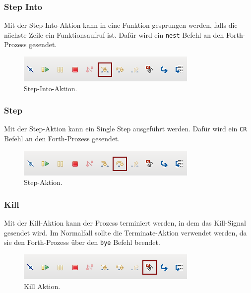 \subsubsection{Step Into}

Mit der Step-Into-Aktion kann in eine Funktion gesprungen werden, falls die nächste Zeile ein Funktionsaufruf ist. Dafür wird ein \verb!nest! Befehl an den Forth-Prozess gesendet.

\begin{figure}[H]
	\centering
		\includegraphics[scale=1]{debugger/stepinto.png}
		\caption{Step-Into-Aktion.}
		\label{fig:stepinto}
\end{figure}

\newpage

\subsubsection{Step}

Mit der Step-Aktion kann ein Single Step ausgeführt werden. Dafür wird ein \verb!CR! Befehl an den Forth-Prozess gesendet.

\begin{figure}[H]
	\centering
		\includegraphics[scale=1]{debugger/step.png}
		\caption{Step-Aktion.}
		\label{fig:step}
\end{figure}

\subsubsection{Kill}

Mit der Kill-Aktion kann der Prozess terminiert werden, in dem das Kill-Signal gesendet wird. Im Normalfall sollte die Terminate-Aktion verwendet werden, da sie den Forth-Prozess über den \verb!bye! Befehl beendet.

\begin{figure}[H]
	\centering
		\includegraphics[scale=1]{debugger/kill.png}
		\caption{Kill Aktion.}
		\label{fig:kill}
\end{figure}

